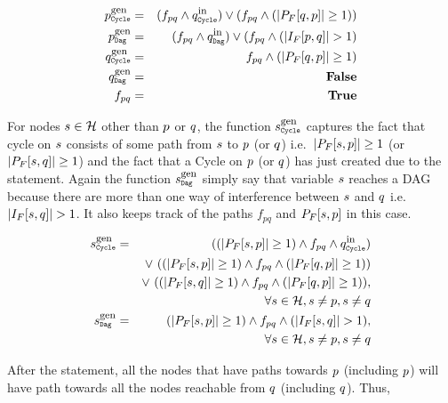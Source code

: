 \begin{eqnarray*}
  \GenC{p} &=& (f_{\p\q} \wedge \InC{q}) \vee (f_{\p\q} \wedge (\num{\DFM{\q}{\p}} \geq 1)) \\
  \GenD{p} &=& (f_{\p\q} \wedge \InD{q}) \vee (f_{\p\q} \wedge (\num{\IFM{\p}{\q}} > 1) \\
  \GenC{q} &=& f_{\p\q} \wedge (\num{\DFM{\q}{\p}} \geq 1) \\
  \GenD{q} &=& \false\\ 
  f_{\p\q} &=& \true
\end{eqnarray*}

For  nodes  $s \in  \mathcal{H}$  other  than  $p$ or  $q$,  the
function  $\GenC{\s}$ captures  the fact  that cycle  on $s$
consists  of   some  path  from   $s$  to  $p$   (or  $q$)
i.e.\  $|P_F[s,p]|  \geq  1$ (or  $|P_F[s,q]|
\geq 1$) and the fact that a Cycle on $p$ (or $q$) has just
created due to the  statement. Again the function $\GenD{\s}$
simply say that variable $s$ reaches a DAG because there are
more  than one  way  of interference  between  $s$ and  $q$
i.e.\ $|I_F[s,q]|  > 1$.  It also keeps  track of the
paths $f_{pq}$ and $P_F[s,p]$ in this case.

\begin{eqnarray*}
  \GenC{\s} &=&  ((\num{\DFM{\s}{\p}} \geq 1) \wedge f_{\p\q} \wedge \InC{q}) \\
  && \vee\ ((\num{\DFM{\s}{\p}} \geq 1) \wedge f_{\p\q} \wedge (\num{\DFM{\q}{\p}} \geq 1)) \\ 
  && \vee\ ((\num{\DFM{\s}{\q}} \geq 1) \wedge f_{\p\q} \wedge (\num{\DFM{\q}{\p}} \geq 1)), \\
  && \qquad \qquad  \forall \s \in \heap, \s \not= \p, \s \not=\q \\
  \GenD{\s}   &=& (\num{\DFM{\s}{\p}} \geq 1) \wedge  f_{\p\q} \wedge (\num{\IFM{\s}{\q}} > 1), \\
  && \qquad \qquad \forall \s \in \heap, \s \not= \p, \s \not=\q 
\end{eqnarray*}

After the  statement, all the  nodes that have  paths towards
$p$ (including  $p$) will have  path towards all  the nodes
reachable  from $q$  (including  $q$).  Thus,

